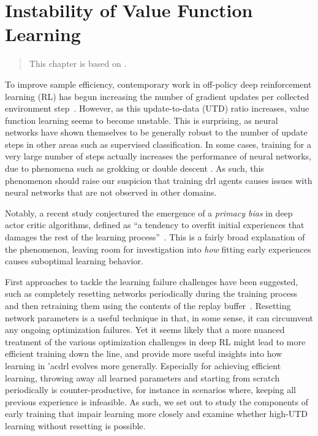 \chapter{Instability of Value Function Learning}
\label{chap:overestimation}

\begin{quote}
    This chapter is based on .
\end{quote}

To improve sample efficiency, contemporary work in off-policy deep reinforcement learning (RL) has begun increasing the number of gradient updates per collected environment step~\parencite{janner2019mbpo,fedus2020revisiting,chen2021randomized, hiraoka2022dropout, nikishin2022primacy, doro2023barrier, schwarzer2023bigger, kim2023resetensemble}.  
However, as this update-to-data (UTD) ratio increases, value function learning seems to become unstable.
This is surprising, as neural networks have shown themselves to be generally robust to the number of update steps in other areas such as supervised classification.
In some cases, training for a very large number of steps actually increases the performance of neural networks, due to phenomena such as grokking \parencite{power2022grokking} or double descent \parencite{belkin2019reconciling}.
As such, this phenomenon should raise our suspicion that training \ac{drl} agents causes issues with neural networks that are not observed in other domains.

Notably, a recent study conjectured the emergence of a \emph{primacy bias} in deep actor critic algorithms, defined as ``a tendency to overfit initial experiences that damages the rest of the learning process''~\parencite{nikishin2022primacy}. 
This is a fairly broad explanation of the phenomenon, leaving room for investigation into \emph{how} fitting early experiences causes suboptimal learning behavior.

First approaches to tackle the learning failure challenges have been suggested, such as completely resetting networks periodically during the training process and then retraining them using the contents of the replay buffer~\parencite{nikishin2022primacy, doro2023barrier}. 
Resetting network parameters is a useful technique in that, in some sense, it can circumvent any ongoing optimization failures. 
Yet it seems likely that a more nuanced treatment of the various optimization challenges in deep RL might lead to more efficient training down the line, and provide more useful insights into how learning in 'ac{drl} evolves more generally. 
Especially for achieving efficient learning, throwing away all learned parameters and starting from scratch periodically is counter-productive, for instance in scenarios where, keeping all previous experience is infeasible. %
As such, we set out to study the components of early training that impair learning more closely and examine whether high-UTD learning without resetting is possible.


